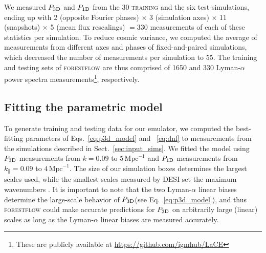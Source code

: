 \documentclass[longauth]{aa}
\newcommand{\lya}{Lyman-$\alpha$\xspace}
\newcommand{\poned}{\ensuremath{P_{\rm 1D}}\xspace}
\newcommand{\pthreed}{\ensuremath{P_{\rm 3D}}\xspace}
\newcommand{\forestflow}{\textsc{forestflow}\xspace}
\newcommand{\lacehc}{\textsc{training}\xspace}
\newcommand{\iMpc}{\ensuremath{\,\mathrm{Mpc}^{-1}}}
\begin{document}
We measured \pthreed and \poned from the 30 \lacehc and the six test simulations, ending up with 2 (opposite Fourier phases) $\times$ 3 (simulation axes) $\times$ 11 (snapshots) $\times$ 5 (mean flux rescalings) $=330$ measurements of each of these statistics per simulation. To reduce cosmic variance, we computed the average of measurements from different axes and phases of fixed-and-paired simulations, which decreased the number of measurements per simulation to 55. The training and testing sets of \forestflow are thus comprised of 1650 and 330 \lya power spectra measurements\footnote{These are publicly available at \url{https://github.com/igmhub/LaCE}}, respectively.


\subsection{Fitting the parametric model}
\label{sec:input_fitting}

To generate training and testing data for our emulator, we computed the best-fitting parameters of Eqs.~\ref{eq:p3d_model} and ~\ref{eq:dnl} to measurements from the simulations described in Sect.~\ref{sec:input_sims}. We fitted the model using \pthreed measurements from $k=0.09$ to $5\iMpc$ and \poned measurements from $k_\parallel=0.09$ to $4\iMpc$. The size of our simulation boxes determines the largest scales used, while the smallest scales measured by DESI set the maximum wavenumbers \citep{ravoux2023DarkEnergySpectroscopica, karacayli2024Optimal1DLy}. It is important to note that the two \lya linear biases determine the large-scale behavior of \pthreed (see Eq.~\ref{eq:p3d_model}), and thus \forestflow could make accurate predictions for \pthreed on arbitrarily large (linear) scales as long as the \lya linear biases are measured accurately.
\end{document}
